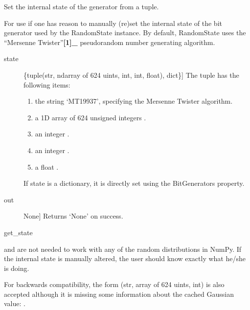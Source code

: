 \documentclass[letterpaper,10pt,english]{sphinxmanual}
\begin{document}
\begin{fulllineitems}
\label{\detokenize{infrapy.utils:infrapy.utils.ref2sac.set_state}}
Set the internal state of the generator from a tuple.

For use if one has reason to manually (re\sphinxhyphen{})set the internal state of
the bit generator used by the RandomState instance. By default,
RandomState uses the “Mersenne Twister”{\color{red}\bfseries{}{[}1{]}\_} pseudo\sphinxhyphen{}random number
generating algorithm.
\begin{description}
\item[{state}] \leavevmode{[}\{tuple(str, ndarray of 624 uints, int, int, float), dict\}{]}
The  tuple has the following items:
\begin{enumerate}
%
\item {} 
the string ‘MT19937’, specifying the Mersenne Twister algorithm.

\item {} 
a 1\sphinxhyphen{}D array of 624 unsigned integers .

\item {} 
an integer .

\item {} 
an integer .

\item {} 
a float .

\end{enumerate}

If state is a dictionary, it is directly set using the BitGenerators
 property.

\end{description}
\begin{description}
\item[{out}] \leavevmode{[}None{]}
Returns ‘None’ on success.

\end{description}

get\_state

 and  are not needed to work with any of the
random distributions in NumPy. If the internal state is manually altered,
the user should know exactly what he/she is doing.

For backwards compatibility, the form (str, array of 624 uints, int) is
also accepted although it is missing some information about the cached
Gaussian value: .

\end{fulllineitems}
\end{document}
